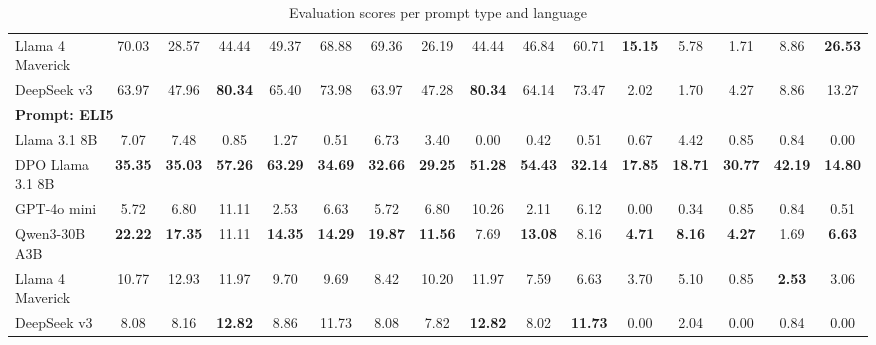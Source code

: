 \documentclass{article}%
\begin{document}
\begin{table}[h!]
\begin{tabular}{@{}lccccccccccccccc@{}}
Llama 4 Maverick&70.03&28.57&44.44&49.37&68.88&69.36&26.19&44.44&46.84&60.71&\textbf{15.15}&5.78&1.71&8.86&\textbf{26.53}\\%
DeepSeek v3&63.97&47.96&\textbf{80.34}&65.40&73.98&63.97&47.28&\textbf{80.34}&64.14&73.47&2.02&1.70&4.27&8.86&13.27\\%
\midrule%
\multicolumn{16}{l}{\textbf{Prompt: ELI5}} \\%
Llama 3.1 8B&7.07&7.48&0.85&1.27&0.51&6.73&3.40&0.00&0.42&0.51&0.67&4.42&0.85&0.84&0.00\\%
DPO Llama 3.1 8B&\textbf{35.35}&\textbf{35.03}&\textbf{57.26}&\textbf{63.29}&\textbf{34.69}&\textbf{32.66}&\textbf{29.25}&\textbf{51.28}&\textbf{54.43}&\textbf{32.14}&\textbf{17.85}&\textbf{18.71}&\textbf{30.77}&\textbf{42.19}&\textbf{14.80}\\%
GPT{-}4o mini&5.72&6.80&11.11&2.53&6.63&5.72&6.80&10.26&2.11&6.12&0.00&0.34&0.85&0.84&0.51\\%
Qwen3{-}30B A3B&\textbf{22.22}&\textbf{17.35}&11.11&\textbf{14.35}&\textbf{14.29}&\textbf{19.87}&\textbf{11.56}&7.69&\textbf{13.08}&8.16&\textbf{4.71}&\textbf{8.16}&\textbf{4.27}&1.69&\textbf{6.63}\\%
Llama 4 Maverick&10.77&12.93&11.97&9.70&9.69&8.42&10.20&11.97&7.59&6.63&3.70&5.10&0.85&\textbf{2.53}&3.06\\%
DeepSeek v3&8.08&8.16&\textbf{12.82}&8.86&11.73&8.08&7.82&\textbf{12.82}&8.02&\textbf{11.73}&0.00&2.04&0.00&0.84&0.00\\\bottomrule%
%
\end{tabular}%
\caption{Evaluation scores per prompt type and language}%
\end{table}

%
\end{document}
